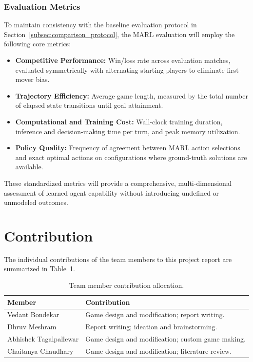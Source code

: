 \documentclass{article}
\begin{document}
\subsubsection{Evaluation Metrics}
\label{subsubsec:eval_metrics}

To maintain consistency with the baseline evaluation protocol in Section~\ref{subsec:comparison_protocol}, the MARL evaluation will employ the following core metrics:
\begin{itemize}
    \item \textbf{Competitive Performance:} Win/loss rate across evaluation matches, evaluated symmetrically with alternating starting players to eliminate first-mover bias.
    \item \textbf{Trajectory Efficiency:} Average game length, measured by the total number of elapsed state transitions until goal attainment.
    \item \textbf{Computational and Training Cost:} Wall-clock training duration, inference and decision-making time per turn, and peak memory utilization.
    \item \textbf{Policy Quality:} Frequency of agreement between MARL action selections and exact optimal actions on configurations where ground-truth solutions are available.
\end{itemize}
These standardized metrics will provide a comprehensive, multi-dimensional assessment of learned agent capability without introducing undefined or unmodeled outcomes.

\section{Contribution}
\label{sec:contribution}

The individual contributions of the team members to this project report are summarized in Table~\ref{tab:contributions}.

\begin{table}[H]
\centering
\caption{Team member contribution allocation.}
\label{tab:contributions}
\begin{tabular}{lp{10.5cm}}
\toprule
\textbf{Member} & \textbf{Contribution} \\
\midrule
Vedant Bondekar & Game design and modification; report writing. \\
Dhruv Meshram & Report writing; ideation and brainstorming. \\
Abhishek Tagalpallewar & Game design and modification; custom game making. \\
Chaitanya Chaudhary & Game design and modification; literature review. \\
\bottomrule
\end{tabular}
\end{table}

  
  
\end{document}
